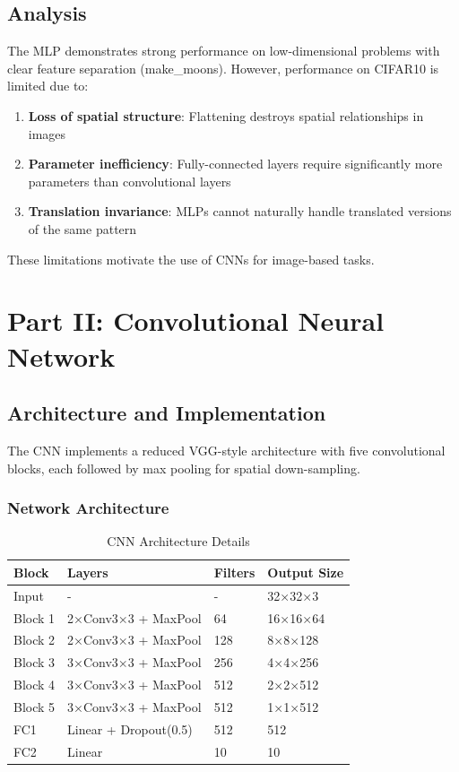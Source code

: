 \documentclass[11pt,a4paper]{article}
\begin{document}
\subsection{Analysis}

The MLP demonstrates strong performance on low-dimensional problems with clear feature separation (make\_moons). However, performance on CIFAR10 is limited due to:

\begin{enumerate}
    \item \textbf{Loss of spatial structure}: Flattening destroys spatial relationships in images
    \item \textbf{Parameter inefficiency}: Fully-connected layers require significantly more parameters than convolutional layers
    \item \textbf{Translation invariance}: MLPs cannot naturally handle translated versions of the same pattern
\end{enumerate}

These limitations motivate the use of CNNs for image-based tasks.

\section{Part II: Convolutional Neural Network}

\subsection{Architecture and Implementation}

The CNN implements a reduced VGG-style architecture with five convolutional blocks, each followed by max pooling for spatial down-sampling.

\subsubsection{Network Architecture}

\begin{table}[H]
\centering
\caption{CNN Architecture Details}
\begin{tabular}{@{}llll@{}}
\toprule
Block & Layers & Filters & Output Size \\ \midrule
Input & - & - & 32×32×3 \\
Block 1 & 2×Conv3×3 + MaxPool & 64 & 16×16×64 \\
Block 2 & 2×Conv3×3 + MaxPool & 128 & 8×8×128 \\
Block 3 & 3×Conv3×3 + MaxPool & 256 & 4×4×256 \\
Block 4 & 3×Conv3×3 + MaxPool & 512 & 2×2×512 \\
Block 5 & 3×Conv3×3 + MaxPool & 512 & 1×1×512 \\
FC1 & Linear + Dropout(0.5) & 512 & 512 \\
FC2 & Linear & 10 & 10 \\ \bottomrule
\end{tabular}
\end{table}
\end{document}
